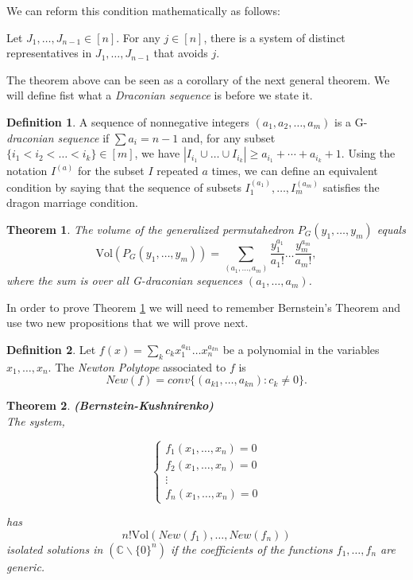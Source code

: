 \documentclass[english,11pt]{article}
\newtheorem{theorem}{Theorem}[section]
\theoremstyle{definition}
\newtheorem{definition}{Definition}[section]
\theoremstyle{definition}
\theoremstyle{definition}
\theoremstyle{remark}
\theoremstyle{definition}
\begin{document}
We can reform this condition mathematically as follows:

Let $J_1, \dots, J_{n-1} \in [n]$. For any $j\in [n]$, there is a system of distinct representatives in $J_1, \dots, J_{n-1}$ that avoids $j$.

The theorem above can be seen as a corollary of the next general theorem. We will define fist what a \textit{Draconian sequence} is before we state it.

\begin{definition}
A sequence of nonnegative integers $(a_1, a_2, \dots, a_m)$ is a G-\textit{draconian sequence} if $\sum a_i= n-1$ and, for any subset $\{i_1<i_2<\dots<i_k\}\in [m]$, we have $|I_{i_1} \cup \dots \cup I_{i_k}| \geq a_{i_1}+\cdots + a_{i_k}+1$. Using the notation $I^{(a)}$ for the subset $I$ repeated $a$ times, we can define an equivalent condition  by saying that the sequence of subsets $I_1^{(a_1)}, \dots, I_m^{(a_m)}$ satisfies the dragon marriage condition.
\end{definition}

\begin{theorem}
The volume of the generalized permutahedron $P_G(y_1, \dots, y_m)$ equals
$$\text{Vol} \left (P_G(y_1,\dots,y_m)\right )= \sum_{(a_1,\dots, a_m)} \frac{y_1^{a_1}}{a_1!}\dots \frac{y_m^{a_m}}{a_m!},$$
where the sum is over all G-\textit{draconian sequences} $(a_1, \dots, a_m)$.
\label{Theo}
\end{theorem}

In order to prove Theorem \ref{Theo} we will need to remember Bernstein's Theorem and use two new propositions that we will prove next.

\begin{definition}
Let $f(x)= \sum_k c_k x_1^{a_{k1}}\dots x_n^{a_{kn}}$ be a polynomial in the variables $x_1, \dots, x_n$. The \textit{Newton Polytope} associated to $f$ is
$$New(f)= conv \{(a_{k1}, \dots, a_{kn}): c_k\neq 0\}.$$
\end{definition}

\begin{theorem}\textbf{(Bernstein-Kushnirenko)}\\
The system,
\begin{center}
  $$\begin{cases}
    f_1(x_1, \dots, x_n)=0\\
f_2(x_1, \dots, x_n)=0\\
\vdots \\
f_n(x_1, \dots, x_n)=0
\end{cases}  $$
\end{center}
has
$$n! \text{Vol}(New(f_1), \dots, New(f_n))$$
isolated solutions in $(\mathbb{C}\backslash \{0\}^n)$ if the coefficients of the functions $f_1, \dots, f_n$ are generic.
\end{theorem}
\end{document}
